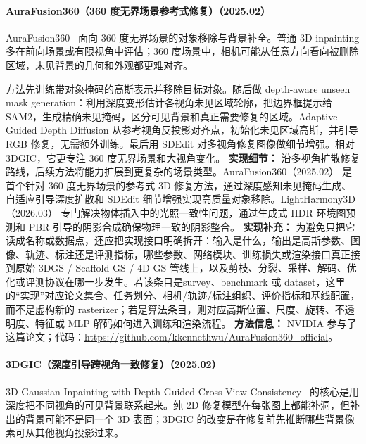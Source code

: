 \paragraph{AuraFusion360（360 度无界场景参考式修复）（2025.02）}
AuraFusion360~\cite{2502_05176} 面向 360 度无界场景的对象移除与背景补全。普通 3D inpainting 多在前向场景或有限视角中评估；360 度场景中，相机可能从任意方向看向被删除区域，未见背景的几何和外观都更难对齐。

方法先训练带对象掩码的高斯表示并移除目标对象。随后做 depth-aware unseen mask generation：利用深度变形估计各视角未见区域轮廓，把边界框提示给 SAM2，生成精确未见掩码，区分可见背景和真正需要修复的区域。Adaptive Guided Depth Diffusion 从参考视角反投影对齐点，初始化未见区域高斯，并引导 RGB 修复，无需额外训练。最后用 SDEdit 对多视角修复图像做细节增强。相对 3DGIC，它更专注 360 度无界场景和大视角变化。
\textbf{实现细节：} 沿多视角扩散修复路线，后续方法将能力扩展到更复杂的场景类型。AuraFusion360（2025.02） 是首个针对 360 度无界场景的参考式 3D 修复方法，通过深度感知未见掩码生成、自适应引导深度扩散和 SDEdit 细节增强实现高质量对象移除。LightHarmony3D（2026.03） 专门解决物体插入中的光照一致性问题，通过生成式 HDR 环境图预测和 PBR 引导的阴影合成确保物理一致的阴影整合。
\textbf{实现补充：} 为避免只把它读成名称或数据点，还应把实现接口明确拆开：输入是什么，输出是高斯参数、图像、轨迹、标注还是评测指标，哪些参数、网络模块、训练损失或渲染接口真正接到原始 3DGS / Scaffold-GS / 4D-GS 管线上，以及剪枝、分裂、采样、解码、优化或评测协议在哪一步发生。若该条目是survey、benchmark 或 dataset，这里的“实现”对应论文集合、任务划分、相机/轨迹/标注组织、评价指标和基线配置，而不是虚构新的 rasterizer；若是算法条目，则对应高斯位置、尺度、旋转、不透明度、特征或 MLP 解码如何进入训练和渲染流程。
\textbf{方法信息：} NVIDIA 参与了这篇论文；代码：\url{https://github.com/kkennethwu/AuraFusion360_official}。



\paragraph{3DGIC（深度引导跨视角一致修复）（2025.02）}
3D Gaussian Inpainting with Depth-Guided Cross-View Consistency~\cite{2502_11801} 的核心是用深度把不同视角的可见背景联系起来。纯 2D 修复模型在每张图上都能补洞，但补出的背景可能不是同一个 3D 表面；3DGIC 的改变是在修复前先推断哪些背景像素可从其他视角投影过来。

